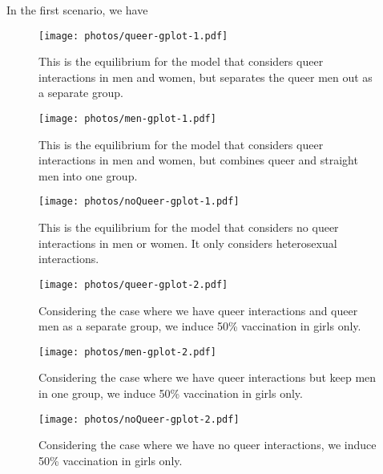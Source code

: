 \documentclass[12pt]{article}
\begin{document}
In the first scenario, we have 

\begin{figure}[h!]
\begin{center}
\texttt{[image: photos/queer-gplot-1.pdf]}
\caption{This is the equilibrium for the model that considers queer interactions in men and women, but separates the queer men out as a separate group.}
\end{center}
\end{figure}

\begin{figure}
\texttt{[image: photos/men-gplot-1.pdf]}
\caption{This is the equilibrium for the model that considers queer interactions in men and women, but combines queer and straight men into one group.}
\end{figure}

\begin{figure}
\texttt{[image: photos/noQueer-gplot-1.pdf]}
\caption{This is the equilibrium for the model that considers no queer interactions in men or women.  It only considers heterosexual interactions.}
\end{figure}
\begin{figure}[h!]
\begin{center}
\texttt{[image: photos/queer-gplot-2.pdf]}
\caption{Considering the case where we have queer interactions and queer men as a separate group, we induce 50\% vaccination in girls only.}
\end{center}
\end{figure}

\begin{figure}[h!]
\begin{center}
\texttt{[image: photos/men-gplot-2.pdf]}
\caption{Considering the case where we have queer interactions but keep men in one group, we induce 50\% vaccination in girls only.}
\end{center}
\end{figure}

\begin{figure}[h!]
\begin{center}
\texttt{[image: photos/noQueer-gplot-2.pdf]}
\caption{Considering the case where we have no queer interactions, we induce 50\% vaccination in girls only.}
\end{center}
\end{figure}
\end{document}
